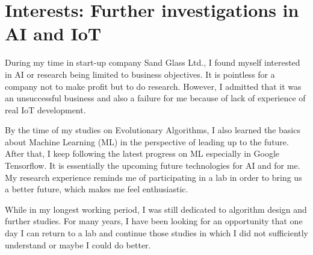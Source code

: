 \section*{Interests: Further investigations in AI and IoT}
During my time in start-up company Sand Glass Ltd.,  I found myself interested in AI or research being limited to business objectives. It is pointless for a company not to make profit but to do research. However, I admitted that it was an unsuccessful business and also a failure for me because of lack of experience of real IoT development. 

By the time of my studies on Evolutionary Algorithms, I also learned the basics about Machine Learning (ML) in the perspective of leading up to the future. After that, I keep following the latest progress on ML especially in Google Tensorflow. It is essentially the upcoming future technologies for AI and for me. My research experience reminds me of participating in a lab in order to bring us a better future, which makes me feel enthusiastic.

While in my longest working period, I was still dedicated to algorithm design and further studies. For many years, I have been looking for an opportunity that one day I can return to a lab and continue those studies in which I did not sufficiently understand or maybe I could do better.
